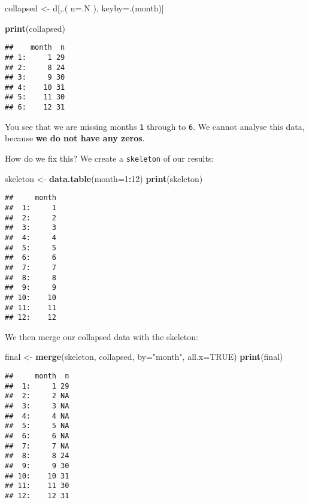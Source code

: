\documentclass[]{book}
\newenvironment{Shaded}{\begin{snugshade}}{\end{snugshade}}
\newcommand{\KeywordTok}[1]{\textcolor[rgb]{0.13,0.29,0.53}{\textbf{#1}}}
\newcommand{\DataTypeTok}[1]{\textcolor[rgb]{0.13,0.29,0.53}{#1}}
\newcommand{\DecValTok}[1]{\textcolor[rgb]{0.00,0.00,0.81}{#1}}
\newcommand{\StringTok}[1]{\textcolor[rgb]{0.31,0.60,0.02}{#1}}
\newcommand{\OtherTok}[1]{\textcolor[rgb]{0.56,0.35,0.01}{#1}}
\newcommand{\OperatorTok}[1]{\textcolor[rgb]{0.81,0.36,0.00}{\textbf{#1}}}
\newcommand{\NormalTok}[1]{#1}
\begin{document}
\begin{Shaded}
\begin{Highlighting}[]
\NormalTok{collapsed <-}\StringTok{ }\NormalTok{d[,.(}
  \DataTypeTok{n=}\NormalTok{.N}
\NormalTok{), keyby=.(month)]}

\KeywordTok{print}\NormalTok{(collapsed)}
\end{Highlighting}
\end{Shaded}

\begin{verbatim}
##    month  n
## 1:     1 29
## 2:     8 24
## 3:     9 30
## 4:    10 31
## 5:    11 30
## 6:    12 31
\end{verbatim}

You see that we are missing months \texttt{1} through to \texttt{6}. We
cannot analyse this data, because \textbf{we do not have any zeros}.

How do we fix this? We create a \texttt{skeleton} of our results:

\begin{Shaded}
\begin{Highlighting}[]
\NormalTok{skeleton <-}\StringTok{ }\KeywordTok{data.table}\NormalTok{(}\DataTypeTok{month=}\DecValTok{1}\OperatorTok{:}\DecValTok{12}\NormalTok{)}
\KeywordTok{print}\NormalTok{(skeleton)}
\end{Highlighting}
\end{Shaded}

\begin{verbatim}
##     month
##  1:     1
##  2:     2
##  3:     3
##  4:     4
##  5:     5
##  6:     6
##  7:     7
##  8:     8
##  9:     9
## 10:    10
## 11:    11
## 12:    12
\end{verbatim}

We then merge our collapsed data with the skeleton:

\begin{Shaded}
\begin{Highlighting}[]
\NormalTok{final <-}\StringTok{ }\KeywordTok{merge}\NormalTok{(skeleton, collapsed, }\DataTypeTok{by=}\StringTok{"month"}\NormalTok{, }\DataTypeTok{all.x=}\OtherTok{TRUE}\NormalTok{)}
\KeywordTok{print}\NormalTok{(final)}
\end{Highlighting}
\end{Shaded}

\begin{verbatim}
##     month  n
##  1:     1 29
##  2:     2 NA
##  3:     3 NA
##  4:     4 NA
##  5:     5 NA
##  6:     6 NA
##  7:     7 NA
##  8:     8 24
##  9:     9 30
## 10:    10 31
## 11:    11 30
## 12:    12 31
\end{verbatim}
\end{document}
